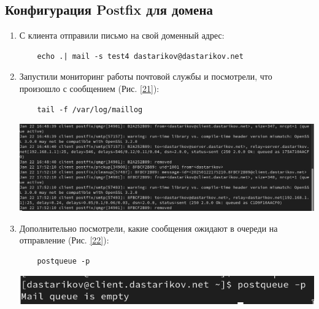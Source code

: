 \subsection{Конфигурация Postfix для домена}
\begin{enumerate}
\item С клиента отправили письмо на свой доменный адрес:
  \begin{verbatim}
    echo .| mail -s test4 dastarikov@dastarikov.net
  \end{verbatim}

\item Запустили мониторинг работы почтовой службы и посмотрели, что произошло с сообщением (Рис. \ref{21}):
  \begin{verbatim}
    tail -f /var/log/maillog
  \end{verbatim}
\begin{center}
    \centering
    \includegraphics[width=\textwidth]{../images/image21.png}
    \label{21}
\end{center}


\item Дополнительно посмотрели, какие сообщения ожидают в очереди на отправление (Рис. \ref{22}):
  \begin{verbatim}
    postqueue -p
  \end{verbatim}
\begin{center}
    \centering
    \includegraphics[width=\textwidth]{../images/image22.png}
    \label{22}
\end{center}


\end{enumerate}
